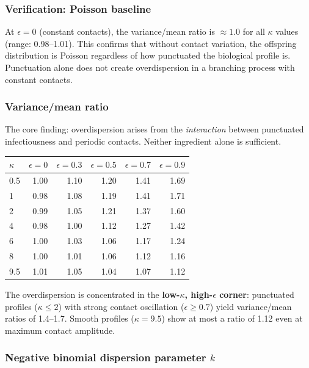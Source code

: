 \documentclass[11pt]{article}
\begin{document}
\subsubsection{Verification: Poisson baseline}

At $\epsilon = 0$ (constant contacts), the variance/mean ratio is $\approx 1.0$ for all $\kappa$ values (range: 0.98--1.01). This confirms that without contact variation, the offspring distribution is Poisson regardless of how punctuated the biological profile is. Punctuation alone does not create overdispersion in a branching process with constant contacts.

\subsubsection{Variance/mean ratio}

The core finding: overdispersion arises from the \textit{interaction} between punctuated infectiousness and periodic contacts. Neither ingredient alone is sufficient.

\medskip
{\small
\begin{tabular}{lrrrrr}
\toprule
$\kappa$ & $\epsilon = 0$ & $\epsilon = 0.3$ & $\epsilon = 0.5$ & $\epsilon = 0.7$ & $\epsilon = 0.9$ \\
\midrule
0.5  & 1.00 & 1.10 & 1.20 & 1.41 & 1.69 \\
1    & 0.98 & 1.08 & 1.19 & 1.41 & 1.71 \\
2    & 0.99 & 1.05 & 1.21 & 1.37 & 1.60 \\
4    & 0.98 & 1.00 & 1.12 & 1.27 & 1.42 \\
6    & 1.00 & 1.03 & 1.06 & 1.17 & 1.24 \\
8    & 1.00 & 1.01 & 1.06 & 1.12 & 1.16 \\
9.5  & 1.01 & 1.05 & 1.04 & 1.07 & 1.12 \\
\bottomrule
\end{tabular}
}
\medskip

The overdispersion is concentrated in the \textbf{low-$\kappa$, high-$\epsilon$ corner}: punctuated profiles ($\kappa \leq 2$) with strong contact oscillation ($\epsilon \geq 0.7$) yield variance/mean ratios of 1.4--1.7. Smooth profiles ($\kappa = 9.5$) show at most a ratio of 1.12 even at maximum contact amplitude.

\subsubsection{Negative binomial dispersion parameter $k$}
\end{document}
